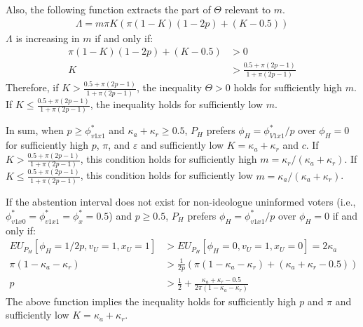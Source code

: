 \par Also, the following function extracts the part of $\Theta$ relevant to $m$. 
\begin{align*}
\Lambda = m \pi K( \pi(1-K)(1-2p)+(K-0.5))
\end{align*}
\noindent $\Lambda$ is increasing in $m$ if and only if: 
\begin{align*}
\pi(1-K)(1-2p)+(K-0.5) &> 0 \\
K &>\frac{0.5 + \pi(2p-1)}{1 + \pi(2p-1)} \tag{Note:$2p-1\geq0$}
\end{align*}
\noindent Therefore, if $K >\frac{0.5 + \pi(2p-1)}{1 + \pi(2p-1)}$, the inequality $\Theta > 0$ holds for sufficiently high $m$. If $K \leq \frac{0.5 + \pi(2p-1)}{1 + \pi(2p-1)}$, the inequality holds for sufficiently low $m$. 

\par In sum, when $p \geq \phi^*_{v1x1}$ and $\kappa_a+\kappa_r \geq 0.5$, $P_H$ prefers $\phi_H=\phi^*_{V1x1}/p$ over $\phi_H=0$ for sufficiently high $p$, $\pi$, and $\varepsilon$ and sufficiently low $K = \kappa_a + \kappa_r$ and $c$. If $K >\frac{0.5 + \pi(2p-1)}{1 + \pi(2p-1)}$, this condition holds for sufficiently high $m = \kappa_r/(\kappa_a+\kappa_r)$. If $K \leq \frac{0.5 + \pi(2p-1)}{1 + \pi(2p-1)}$, this condition holds for sufficiently low $m = \kappa_a/(\kappa_a+\kappa_r)$.

\par If the abstention interval does not exist for non-ideologue uninformed voters (i.e., $\phi^*_{v1x0}=\phi^*_{v1x1}=\phi^*_x=0.5$) and $p \geq 0.5$, $P_H$ prefers $\phi_H = \phi^*_{v1x1}/p$ over $\phi_H = 0$ if and only if:
\begin{align*}
EU_{P_H}[\phi_H = 1/2p, v_U = 1, x_U = 1] &> EU_{P_H}[\phi_H=0, v_U=1, x_U=0] = 2 \kappa_a \\ 
\pi (1-\kappa_a-\kappa_r) &> \frac{1}{2p} (\pi(1-\kappa_a-\kappa_r) + (\kappa_a + \kappa_r - 0.5)) \\
p &> \frac{1}{2}+ \frac{\kappa_a + \kappa_r - 0.5}{2\pi(1-\kappa_a-\kappa_r)}
\end{align*}
\noindent The above function implies the inequality holds for sufficiently high $p$ and $\pi$ and sufficiently low $K = \kappa_a + \kappa_r$.


